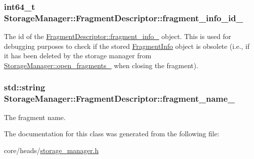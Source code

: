 \subsubsection[{fragment\+\_\+info\+\_\+id\+\_\+}]{\setlength{\rightskip}{0pt plus 5cm}int64\+\_\+t Storage\+Manager\+::\+Fragment\+Descriptor\+::fragment\+\_\+info\+\_\+id\+\_\+\hspace{0.3cm}{\ttfamily [private]}}\label{classStorageManager_1_1FragmentDescriptor_af22f12dd602adeb5b1fde62593fa1c1b}
The id of the \hyperlink{classStorageManager_1_1FragmentDescriptor_a2f5330bdbf0aff8e03650dd103e46b39}{Fragment\+Descriptor\+::fragment\+\_\+info\+\_\+} object. This is used for debugging purposes to check if the stored \hyperlink{structStorageManager_1_1FragmentInfo}{Fragment\+Info} object is obsolete (i.\+e., if it has been deleted by the storage manager from \hyperlink{classStorageManager_adb5e6670a3394342cc683288430446af}{Storage\+Manager\+::open\+\_\+fragments\+\_\+} when closing the fragment). \hypertarget{classStorageManager_1_1FragmentDescriptor_a6e93d68d8fd106ab867a4db03901b322}{}
\subsubsection[{fragment\+\_\+name\+\_\+}]{\setlength{\rightskip}{0pt plus 5cm}std\+::string Storage\+Manager\+::\+Fragment\+Descriptor\+::fragment\+\_\+name\+\_\+\hspace{0.3cm}{\ttfamily [private]}}\label{classStorageManager_1_1FragmentDescriptor_a6e93d68d8fd106ab867a4db03901b322}
The fragment name. 

The documentation for this class was generated from the following file\+:\begin{DoxyCompactItemize}
\item 
core/heads/\hyperlink{storage__manager_8h}{storage\+\_\+manager.\+h}\end{DoxyCompactItemize}
